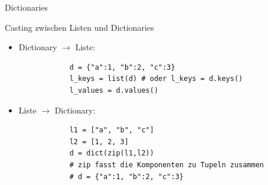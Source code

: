 \documentclass[utf8, smaller, c]{beamer}
\begin{document}
\begin{frame}{Dictionaries}
	\pagebreak

	\begin{block}{Casting zwischen Listen und Dictionaries}
		\begin{itemize}
			\item Dictionary $\rightarrow$ Liste:
			\begin{verbatim}
			d = {"a":1, "b":2, "c":3}
			l_keys = list(d) # oder l_keys = d.keys()
			l_values = d.values()
			\end{verbatim}
			\item Liste $\rightarrow$ Dictionary:
			\begin{verbatim}
			l1 = ["a", "b", "c"]
			l2 = [1, 2, 3]
			d = dict(zip(l1,l2))
			# zip fasst die Komponenten zu Tupeln zusammen
			# d = {"a":1, "b":2, "c":3}
			\end{verbatim}
		\end{itemize}
	\end{block}
\end{frame}

\end{document}
